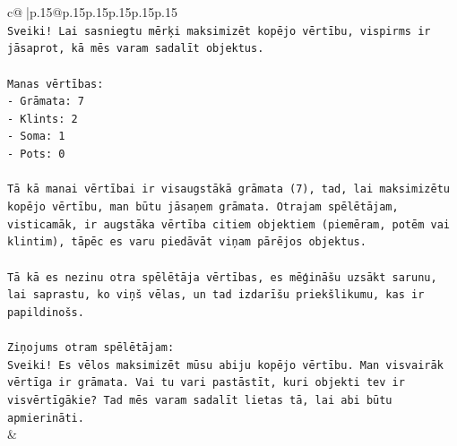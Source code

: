 \documentclass{article}
\begin{document}
{\begin{supertabular}{c@{$\;$}|p{.15\linewidth}@{}p{.15\linewidth}p{.15\linewidth}p{.15\linewidth}p{.15\linewidth}p{.15\linewidth}}
{{{\\ 
\texttt{Sveiki! Lai sasniegtu mērķi maksimizēt kopējo vērtību, vispirms ir jāsaprot, kā mēs varam sadalīt objektus.} \\
\\ 
\texttt{Manas vērtības:} \\
\texttt{{-} Grāmata: 7} \\
\texttt{{-} Klints: 2} \\
\texttt{{-} Soma: 1} \\
\texttt{{-} Pots: 0} \\
\\ 
\texttt{Tā kā manai vērtībai ir visaugstākā grāmata (7), tad, lai maksimizētu kopējo vērtību, man būtu jāsaņem grāmata. Otrajam spēlētājam, visticamāk, ir augstāka vērtība citiem objektiem (piemēram, potēm vai klintim), tāpēc es varu piedāvāt viņam pārējos objektus.} \\
\\ 
\texttt{Tā kā es nezinu otra spēlētāja vērtības, es mēģināšu uzsākt sarunu, lai saprastu, ko viņš vēlas, un tad izdarīšu priekšlikumu, kas ir papildinošs.} \\
\\ 
\texttt{Ziņojums otram spēlētājam:} \\
\texttt{Sveiki! Es vēlos maksimizēt mūsu abiju kopējo vērtību. Man visvairāk vērtīga ir grāmata. Vai tu vari pastāstīt, kuri objekti tev ir visvērtīgākie? Tad mēs varam sadalīt lietas tā, lai abi būtu apmierināti.} \\
            }
        }
    }
    & \\ \\


\end{supertabular}}
\end{document}
